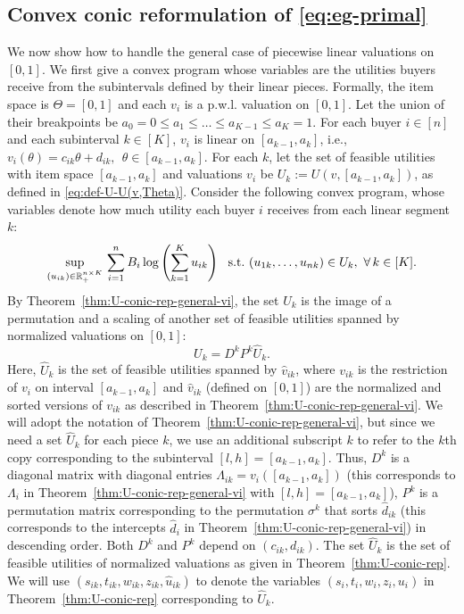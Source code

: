 \subsection{Convex conic reformulation of \eqref{eq:eg-primal}} \label{subsec:convex-conic-reform-of-EG-pwl}
We now show how to handle the general case of piecewise linear valuations on $[0,1]$.
We first give a convex program whose variables are the utilities buyers receive from the subintervals defined by their linear pieces.
Formally, the item space is $\Theta = [0,1]$ and each $v_i$ is a p.w.l. valuation on $[0,1]$. Let the union of their breakpoints be $a_0 = 0 \leq a_1 \leq \dots \leq a_{K-1} \leq a_K = 1$. 
For each buyer $i\in [n]$ and each subinterval $k\in [K]$, $v_i$ is linear on $[a_{k-1}, a_k]$, i.e., 
$v_i(\theta) = c_{ik} \theta + d_{ik},\ \ \theta \in [a_{k-1}, a_k]$.
For each $k$, let the set of feasible utilities with item space $[a_{k-1},a_k]$ and valuations $v_i$ be $U_k := U(v, [a_{k-1}, a_k])$,
as defined in \eqref{eq:def-U-U(v,Theta)}. 
Consider the following convex program, whose variables denote how much utility each buyer $i$ receives from each linear segment $k$:
\begin{align}
	\sup_{(u_{ik}) \in \mathbb{R}_+^{n\times K} } \, \sum_{i=1}^n B_i \log \left(\sum_{k=1}^K u_{ik}\right) \ \ {\rm s.t.}\  (u_{1k}, \dots, u_{nk}) \in U_{k},\ \forall\,k \in [K].
	\label{eq:convex-prog-u(ik)}
\end{align}
By Theorem~\ref{thm:U-conic-rep-general-vi}, the set $U_k$ is the image of a permutation and a scaling of another set of feasible utilities spanned by normalized valuations on $[0,1]$:
\[ U_k = D^k P^k \hat{U}_k.\]
Here, $\hat{U}_k$ is the set of feasible utilities spanned by $\hat{v}_{ik}$, where $v_{ik}$ is the restriction of $v_i$ on interval $[a_{k-1}, a_k]$ and $\hat{v}_{ik}$ (defined on $[0,1]$) are the normalized and sorted versions of $v_{ik}$ as described in Theorem~\ref{thm:U-conic-rep-general-vi}. 
We will adopt the notation of Theorem~\ref{thm:U-conic-rep-general-vi}, but since we need a set $\hat U_k$ for each piece $k$, we use an additional subscript $k$ to refer to the $k$th copy corresponding to the subinterval $[l,h] = [a_{k-1}, a_k]$.
Thus, $D^k$ is a diagonal matrix with diagonal entries $\Lambda_{ik} = v_i([a_{k-1}, a_k])$ (this corresponds to $\Lambda_i$ in Theorem~\ref{thm:U-conic-rep-general-vi} with $[l,h] = [a_{k-1}, a_k]$), $P^k$ is a permutation matrix corresponding to the permutation $\sigma^k$ that sorts $\hat{d}_{ik}$ (this corresponds to the intercepts $\hat{d}_i$ in Theorem~\ref{thm:U-conic-rep-general-vi}) in descending order. 
Both $D^k$ and $P^k$ depend on $(c_{ik}, d_{ik})$. 
The set $\hat{U}_k$ is the set of feasible utilities of normalized valuations as given in Theorem~\ref{thm:U-conic-rep}. 
We will use $(s_{ik}, t_{ik}, w_{ik}, z_{ik}, \hat{u}_{ik})$ to denote the  variables $(s_i, t_i, w_i, z_i, u_i)$ in Theorem~\ref{thm:U-conic-rep} corresponding to $\hat U_k$.

